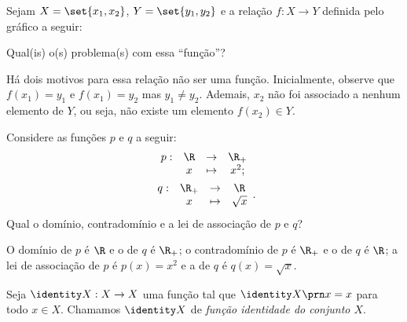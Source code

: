 \begin{example}
Sejam $X = \set{x_1, x_2}$, $Y = \set{y_1, y_2}$ e a relação $f : X \to Y$ definida pelo gráfico a seguir:
\begin{center}
\end{center}
Qual(is) o(s) problema(s) com essa ``função''?
\end{example}
\begin{solution}
Há dois motivos para essa relação não ser uma função. Inicialmente, observe que $f(x_1) = y_1$ e $f(x_1) = y_2$ mas $y_1 \neq y_2$. Ademais, $x_2$ não foi associado a nenhum elemento de $Y$, ou seja, não existe um elemento $f(x_2) \in Y$.
\end{solution}


\begin{example}
\label{example:func-sq-sqrt}
Considere as funções $p$ e $q$ a seguir:
%
\begin{gather*}
\begin{array}{cccc}
p : & \R & \to     & \R_+ \\
     &  x & \mapsto & x^2;
\end{array}\\
\begin{array}{cccc}
q : & \R_+ & \to     & \R \\
     &  x & \mapsto & \sqrt x
\end{array}.
\end{gather*}
%
Qual o domínio, contradomínio e a lei de associação de $p$ e $q$?
\end{example}

\begin{solution}
O domínio de $p$ é $\R$ e o de $q$ é $\R_+$; o contradomínio de $p$ é $\R_+$ e o de $q$ é $\R$; a lei de associação de $p$ é $p(x)=x^2$ e a de $q$ é $q(x)=\sqrt x$.
\end{solution}

\begin{definition}
\label{def:funcao-identidade-conjunto}
Seja $\identity X : X \to X $ uma função tal que $\identity X \prn x = x$ para todo $x \in X$. Chamamos $\identity X$ de \emph{função identidade do conjunto $X$}.
\end{definition}